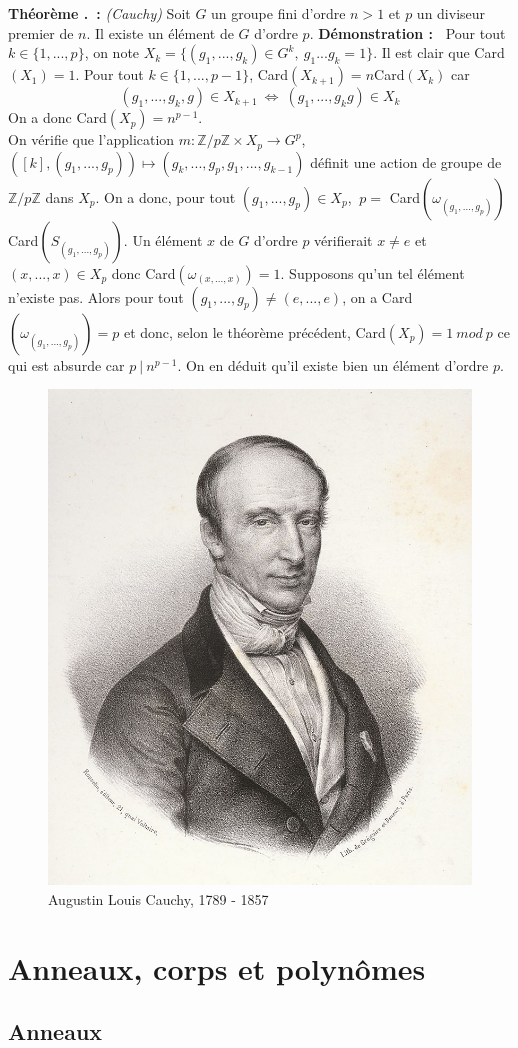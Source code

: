 \documentclass[5pt,a4paper]{article}
\newcounter{thm}[section]
\renewcommand{\thethm}{\thesection.\arabic{thm}}
\newcommand{\thm}[1]{\stepcounter{thm}\noindent\textbf{Théorème \thethm ~:} #1 \newline}
\newcommand{\demo}[1]{\textbf{Démonstration :~} #1 \newline}
\begin{document}
\begin{onehalfspacing}
\thm{\textit{(Cauchy)} Soit $G$ un groupe fini d'ordre $n > 1$ et $p$ un diviseur premier de $n$. Il existe un élément de $G$ d'ordre $p$.}
\demo{Pour tout $k \in \{1, ..., p\}$, on note $X_k = \{(g_1, ..., g_k) \in G^k,~g_1...g_k = 1\}$. Il est clair que Card$(X_1) = 1$. Pour tout $k \in \{1, ..., p-1\}$, Card$(X_{k+1}) = n$Card$(X_k)$ car
\[ (g_1, ..., g_k, g) \in X_{k+1}~\Leftrightarrow~(g_1, ..., g_kg) \in X_k \] On a donc Card$(X_p) = n^{p-1}$. \\
On vérifie que l'application $m : \mathbb{Z}/p\mathbb{Z} \times X_p \rightarrow G^p$, $([k], (g_1, ..., g_p)) \mapsto (g_k, ..., g_p, g_1, ..., g_{k-1})$ définit une action de groupe de $\mathbb{Z}/p\mathbb{Z}$ dans $X_p$. On a donc, pour tout $(g_1, ..., g_p) \in X_p$, $~p =$ Card$(\omega_{(g_1, ..., g_p)})$Card$(S_{(g_1, ..., g_p)})$. Un élément $x$ de $G$ d'ordre $p$ vérifierait $x \neq e$ et $(x, ..., x) \in X_p$ donc Card$(\omega_{(x, ..., x)}) = 1$. Supposons qu'un tel élément n'existe pas. Alors pour tout $(g_1, ..., g_p) \neq (e, ..., e)$, on a Card$(\omega_{(g_1,...,g_p)}) = p$ et donc, selon le théorème précédent, Card$(X_p) = 1~mod~p$ ce qui est absurde car $p ~|~n^{p-1}$. On en déduit qu'il existe bien un élément d'ordre $p$.}

\begin{figure}[!h]
\centering
\includegraphics[width = 0.286\linewidth]{ressources/cauchy.jpg}
\caption{Augustin Louis Cauchy, 1789 - 1857}
\end{figure}

\newpage
\section{Anneaux, corps et polynômes}

\subsection{Anneaux}


\end{onehalfspacing}
\end{document}
